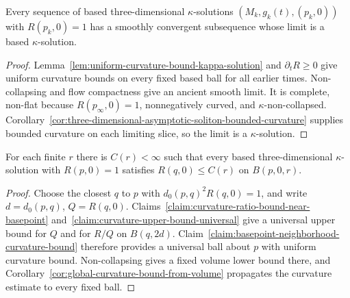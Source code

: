 \begin{theorem}\label{thm:kappa-solution-compactness}
\label{compactkappa}
Every sequence of based three-dimensional $\kappa$-solutions
$(M_k,g_k(t),(p_k,0))$ with $R(p_k,0)=1$ has a smoothly convergent
subsequence whose limit is a based $\kappa$-solution.
\end{theorem}
\begin{proof}
\sketch
{}
Lemma~\ref{lem:uniform-curvature-bound-kappa-solution} and
$\partial_tR\geq0$ give uniform curvature bounds on every fixed
based ball for all earlier times. Non-collapsing and flow compactness
give an ancient smooth limit. It is complete, non-flat because
$R(p_\infty,0)=1$, nonnegatively curved, and $\kappa$-non-collapsed.
Corollary~\ref{cor:three-dimensional-asymptotic-soliton-bounded-curvature}
supplies bounded curvature on each limiting slice, so the limit is
a $\kappa$-solution.
\end{proof}

\begin{lemma}\label{lem:uniform-curvature-bound-kappa-solution}
\label{proposition}
For each finite $r$ there is $C(r)<\infty$ such that every based
three-dimensional $\kappa$-solution with $R(p,0)=1$ satisfies
$R(q,0)\leq C(r)$ on $B(p,0,r)$.
\end{lemma}
\begin{proof}
\sketch
{}
Choose the closest $q$ to $p$ with
$d_0(p,q)^2R(q,0)=1$, and write $d=d_0(p,q)$,
$Q=R(q,0)$. Claims~\ref{claim:curvature-ratio-bound-near-basepoint}
and~\ref{claim:curvature-upper-bound-universal} give a universal
upper bound for $Q$ and for $R/Q$ on $B(q,2d)$.
Claim~\ref{claim:basepoint-neighborhood-curvature-bound} therefore
provides a universal ball about $p$ with uniform curvature bound.
Non-collapsing gives a fixed volume lower bound there, and
Corollary~\ref{cor:global-curvature-bound-from-volume} propagates
the curvature estimate to every fixed ball.
\end{proof}

